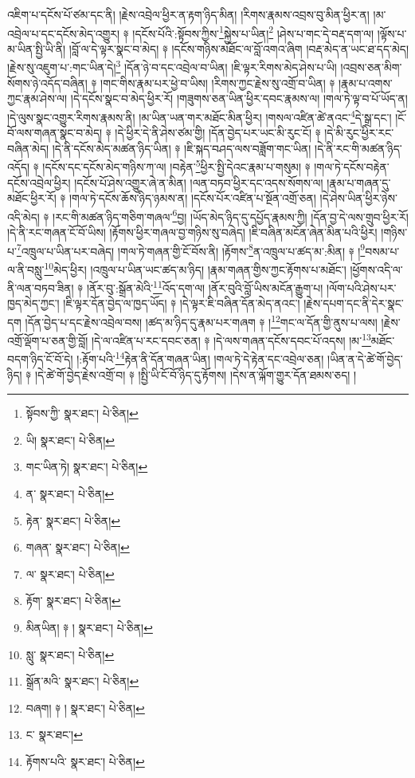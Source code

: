 འཇིག་པ་དངོས་པོ་ཙམ་དང་ནི། །རྗེས་འབྲེལ་ཕྱིར་ན་རྟག་ཉིད་མིན། །རིགས་རྣམས་འབྲས་བུ་མིན་ཕྱིར་ན། །མ་འབྲེལ་པ་དང་དངོས་མེད་འགྱུར། ༈ །དངོས་པོའི་:སྟོབས་ཀྱིས་\footnote{སྟོབས་ཀྱི་  སྣར་ཐང་།  པེ་ཅིན། }སྐྱེས་པ་ཡིན།\footnote{ཡི།  སྣར་ཐང་།  པེ་ཅིན། } །ཤེས་པ་གང་དེ་བརྡ་དག་ལ། །ལྟོས་པ་མ་ཡིན་སྤྱི་ཡི་ནི། །བློ་ལ་དེ་ལྟར་སྣང་བ་མེད། ༈ །དངོས་གཉིས་མཐོང་ལ་བློ་འགའ་ཞིག །བརྡ་མེད་ན་ཡང་ཐ་དད་མེད། །རྗེས་སུ་འཇུག་པ་:གང་ཡིན་དེ།\footnote{གང་ཡིན་ཏེ།  སྣར་ཐང་།  པེ་ཅིན། } །དོན་ཉེ་བ་དང་འབྲེལ་བ་ཡིན། །ཇི་ལྟར་རིགས་མེད་ཤེས་པ་ཡི། །འབྲས་ཅན་མིག་སོགས་ཉེ་འདོད་བཞིན། ༈ །གང་གིས་རྣམ་པར་ཕྱེ་བ་ཡིས། །རིགས་ཀྱང་རྗེས་སུ་འགྲོ་བ་ཡིན། ༈ །རྣམ་པ་འགས་ཀྱང་རྣམ་ཤེས་ལ། །དེ་དངོས་སྣང་བ་མེད་ཕྱིར་རོ། །གཟུགས་ཅན་ཡིན་ཕྱིར་དབང་རྣམས་ལ། །གལ་ཏེ་ལྟ་བ་པོ་ཡོད་ན། །དེ་ལུས་སྣང་འགྱུར་རིགས་རྣམས་ནི། །མ་ཡིན་ཡན་གར་མཐོང་མིན་ཕྱིར། །གསལ་འཛིན་ཚེ་ནའང་\footnote{ན་  སྣར་ཐང་།  པེ་ཅིན། }དེ་སྒྲ་དང་། །ངོ་བོ་ལས་གཞན་སྣང་བ་མེད། ༈ །དེ་ཕྱིར་དེ་ནི་ཤེས་ཙམ་གྱི། །དོན་བྱེད་པར་ཡང་མི་རུང་ངོ། ༈ །དེ་མི་རུང་ཕྱིར་རང་བཞིན་མེད། །དེ་ནི་དངོས་མེད་མཚན་ཉིད་ཡིན། ༈ །ཇི་སྐད་བཤད་ལས་བཟློག་གང་ཡིན། །དེ་ནི་རང་གི་མཚན་ཉིད་འདོད། ༈ །དངོས་དང་དངོས་མེད་གཉིས་ཀ་ལ། །བརྟེན་\footnote{རྟེན་  སྣར་ཐང་།  པེ་ཅིན། }ཕྱིར་སྤྱི་དེའང་རྣམ་པ་གསུམ། ༈ །གལ་ཏེ་དངོས་བརྟེན་དངོས་འབྲེལ་ཕྱིར། །དངོས་པོ་ཤེས་འགྱུར་ཞེ་ན་མིན། །ལན་བཏབ་ཕྱིར་དང་འདས་སོགས་ལ། །རྣམ་པ་གཞན་དུ་མཐོང་ཕྱིར་རོ། ༈ །གལ་ཏེ་དངོས་ཆོས་ཉིད་ཉམས་ན། །དངོས་པོར་འཛིན་པ་སྔོན་འགྲོ་ཅན། །དེ་ཤེས་ཡིན་ཕྱིར་ཉེས་འདི་མེད། ༈ །རང་གི་མཚན་ཉིད་གཅིག་གཞལ་\footnote{གཞན་  སྣར་ཐང་།  པེ་ཅིན། }བྱ། །ཡོད་མེད་ཉིད་དུ་དཔྱོད་རྣམས་ཀྱི། །དོན་བྱ་དེ་ལས་གྲུབ་ཕྱིར་རོ། །དེ་ནི་རང་གཞན་ངོ་བོ་ཡིས། །རྟོགས་ཕྱིར་གཞལ་བྱ་གཉིས་སུ་བཞེད། །ཇི་བཞིན་མངོན་ཞེན་མིན་པའི་ཕྱིར། །གཉིས་པ་\footnote{ལ་  སྣར་ཐང་།  པེ་ཅིན། }འཁྲུལ་པ་ཡིན་པར་བཞེད། །གལ་ཏེ་གཞན་གྱི་ངོ་བོས་ནི། །རྟོགས་\footnote{རྟོག་  སྣར་ཐང་།  པེ་ཅིན། }ན་འཁྲུལ་པ་ཚད་མ་:མིན། ༈ །\footnote{མིནཡིན། ༈ །  སྣར་ཐང་།  པེ་ཅིན། }བསམ་པ་ལ་ནི་བསླུ་\footnote{སླུ་  སྣར་ཐང་།  པེ་ཅིན། }མེད་ཕྱིར། །འཁྲུལ་པ་ཡིན་ཡང་ཚད་མ་ཉིད། །རྣམ་གཞན་གྱིས་ཀྱང་རྟོགས་པ་མཐོང་། །ཕྱོགས་འདི་ལ་ནི་ལན་བཏབ་ཟིན། ༈ །ནོར་བུ་:སྒྲོན་མེའི་\footnote{སྒྲོན་མའི་  སྣར་ཐང་།  པེ་ཅིན། }འོད་དག་ལ། །ནོར་བུའི་བློ་ཡིས་མངོན་རྒྱུག་པ། །ལོག་པའི་ཤེས་པར་ཁྱད་མེད་ཀྱང་། །ཇི་ལྟར་དོན་བྱེད་ལ་ཁྱད་ཡོད། ༈ །དེ་ལྟར་ཇི་བཞིན་དོན་མེད་ནའང་། །རྗེས་དཔག་དང་ནི་དེར་སྣང་དག །དོན་བྱེད་པ་དང་རྗེས་འབྲེལ་བས། །ཚད་མ་ཉིད་དུ་རྣམ་པར་གཞག ༈ །\footnote{བཞག། ༈ །  སྣར་ཐང་།  པེ་ཅིན། }གང་ལ་དོན་གྱི་ནུས་པ་ལས། །རྗེས་འགྲོ་ལྡོག་པ་ཅན་གྱི་བློ། །དེ་ལ་འཛིན་པ་རང་དབང་ཅན། ༈ །དེ་ལས་གཞན་དངོས་དབང་པོ་འདས། །མ་\footnote{ང་  སྣར་ཐང་། }མཐོང་བདག་ཉིད་ངོ་བོ་དེ། །:རྟོག་པའི་\footnote{རྟོགས་པའི་  སྣར་ཐང་།  པེ་ཅིན། }རྟེན་ནི་དོན་གཞན་ཡིན། །གལ་ཏེ་དེ་རྟེན་དང་འབྲེལ་ཅན། །ཡིན་ན་དེ་ཚེ་གོ་བྱེད་ཉིད། ༈ །དེ་ཚེ་གོ་བྱེད་རྗེས་འགྲོ་བ། ༈ །སྤྱི་ཡི་ངོ་བོ་ཉིད་དུ་རྟོགས། །དེས་ན་ལྐོག་གྱུར་དོན་ཐམས་ཅད། །
